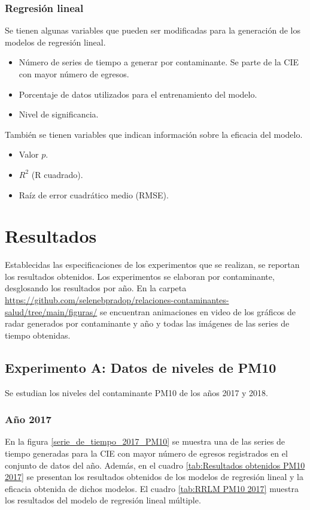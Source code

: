 \subsubsection{Regresión lineal}
Se tienen algunas variables que pueden ser modificadas para la generación de los modelos de regresión lineal.

\begin{itemize}
	\item Número de series de tiempo a generar por contaminante. Se parte de la CIE con mayor número de egresos.
	\item Porcentaje de datos utilizados para el entrenamiento del modelo.
	\item Nivel de significancia.
\end{itemize}

También se tienen variables que indican información sobre la eficacia del modelo.

\begin{itemize}
	\item Valor $p$.
	\item $R^2$ (R cuadrado).
	\item Raíz de error cuadrático medio (RMSE).
\end{itemize}


\clearpage
\section{Resultados}
Establecidas las especificaciones de los experimentos que se realizan, se reportan los resultados obtenidos. Los experimentos se elaboran por contaminante, desglosando los resultados por año. En la carpeta \url{https://github.com/selenebpradop/relaciones-contaminantes-salud/tree/main/figuras/} se encuentran animaciones en video de los gráficos de radar generados por contaminante y año y todas las imágenes de las series de tiempo obtenidas.

\subsection{Experimento A: Datos de niveles de PM10}
Se estudian los niveles del contaminante PM10 de los años 2017 y 2018. 

\subsubsection{Año 2017}
En la figura \ref{serie_de_tiempo_2017_PM10} se muestra una de las series de tiempo generadas para la CIE con mayor número de egresos registrados en el conjunto de datos del año. Además, en el cuadro \ref{tab:Resultados obtenidos PM10 2017} se presentan los resultados obtenidos de los modelos de regresión lineal y la eficacia obtenida de dichos modelos. El cuadro \ref{tab:RRLM PM10 2017} muestra los resultados del modelo de regresión lineal múltiple.

